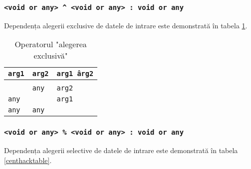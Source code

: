 \subsubsection{\texttt{<void or any> ^ <void or any> : void or any}}

Dependența alegerii exclusive de datele de intrare este demonstrată în tabela \ref{xorhacktable}.

\begin{table}[htb]
	\caption{Operatorul "alegerea exclusivă"}
	\label{xorhacktable}
	\begin{tabular}{|l|l|l|}
		\hline
		\texttt{arg1} & \texttt{arg2} & \texttt{arg1 \^ arg2} \\ \hline
		\void{}     & \void{}     & \void{}   			\\ \hline
		\void{}     & \texttt{any}  & \texttt{arg2}   		\\ \hline
		\texttt{any}  & \void{}     & \texttt{arg1}   		\\ \hline
		\texttt{any}  & \texttt{any}  & \void{}   			\\ \hline
	\end{tabular}
	\vspace{0em}
\end{table}

\subsubsection{\texttt{<void or any> \% <void or any> : void or any}}

Dependența alegerii selective de datele de intrare este demonstrată în tabela \ref{centhacktable}.

